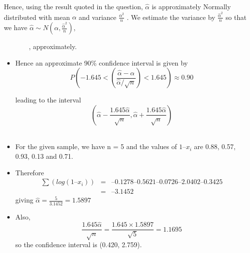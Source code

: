 \documentclass[a4paper,12pt]{article}
\begin{document}
\begin{enumerate}[(a)]
Hence, using the result quoted in the question, $\hat{\alpha}$ is approximately
Normally distributed with mean $\alpha$ and variance
$\frac{\alpha^2}{n}$ . We estimate the variance by
$\frac{\hat{\alpha}^2}{n}$
so that we have
$\hat{\alpha}  \sim N \left(\alpha, \frac{\hat{\alpha}^2}{n} \right)$,

 
 
 
, approximately.

\begin{itemize}
\item Hence an approximate 90\% confidence interval is given by
\[
P\left(-1.645 < \left( \frac{ \hat{\alpha} - \alpha }{ \hat{\alpha} / \sqrt{n} }  \right) < 1.645 \right) \approx 0.90
\]

leading to the interval
\[
\left( \hat{\alpha}  - \frac{1.645 \hat{\alpha}}{\sqrt{n}} , \hat{\alpha} + \frac{1.645 \hat{\alpha}}{\sqrt{n}} \right)
\]
 

\item For the given sample, we have n = 5 and the values of $1 – x_i$ are 0.88, 0.57, 0.93, 0.13
and 0.71. 
\item Therefore
\begin{eqnarray*}
\sum (log(1 – x_i)) &=& –0.1278 – 0.5621 – 0.0726 – 2.0402 – 0.3425 \\ 
&=& –3.1452
\end{eqnarray*}
giving $\hat{\alpha} = \frac{5}{3.1452} = 1.5897$

\item Also,
\[ \frac{1.645 \hat{\alpha}}{\sqrt{n}} = \frac{1.645 \times 1.5897}{\sqrt{5}} = 1.1695\] so the confidence interval is (0.420, 2.759).
\end{itemize}

\end{enumerate}
\end{document}

